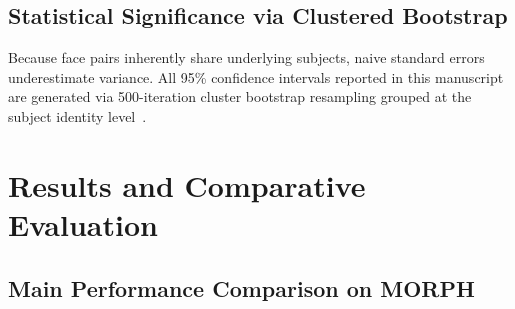 \documentclass[10pt,journal,compsoc]{IEEEtran}
\begin{document}
\subsection{Statistical Significance via Clustered Bootstrap}
Because face pairs inherently share underlying subjects, naive standard errors underestimate variance. All 95\% confidence intervals reported in this manuscript are generated via 500-iteration cluster bootstrap resampling grouped at the subject identity level~\cite{schuckers2001,efron1994bootstrap}.

\section{Results and Comparative Evaluation}
\label{sec:results}

\subsection{Main Performance Comparison on MORPH}
\end{document}
